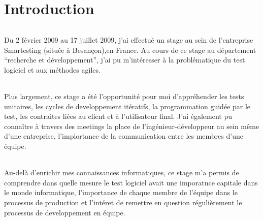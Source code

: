 \chapter*{Introduction}
\subparagraph*{}
Du 2 février 2009 au 17 juillet 2009, j’ai effectué un stage au sein de l’entreprise Smartesting (située à Besançon),en France. Au cours de ce stage au département ``recherche et développement'', j’ai pu m’intéresser à la problématique du test logiciel et aux méthodes agiles.
\subparagraph*{}
Plus largement, ce stage a été l’opportunité pour moi d’appréhender les tests unitaires, les cycles de developpement itératifs, la programmation guidée par le test, les contraites liées au client et à l'utilisateur final. J'ai également pu connaître à travers des meetings la place de l'ingénieur-développeur au sein même d'une entreprise, l'implortance de la communication entre les membres d'une équipe.
\subparagraph*{}
Au-delà d’enrichir mes connaissances informatiques, ce stage m’a permis de comprendre dans quelle mesure le test logiciel avait une imporatnce capitale dans le monde informatique, l'importance de chaque membre de l'équipe dans le processus de production et l'intéret de remettre en question régulièrement le processus de developpement en équipe.
